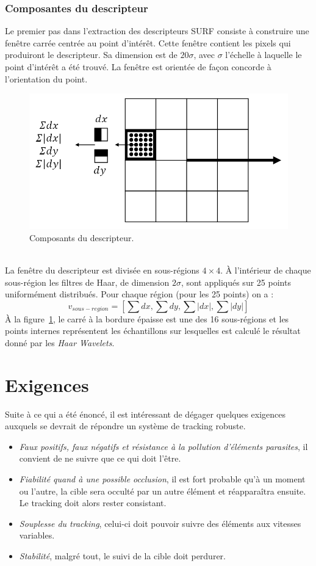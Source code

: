 \documentclass[a4paper,12pt]{report}
\begin{document}
\subsubsection{Composantes du descripteur}
Le premier pas dans l'extraction des descripteurs SURF consiste à construire une fenêtre carrée centrée au point d'intérêt. Cette fenêtre contient les pixels qui produiront le descripteur. Sa dimension est de $20\sigma$, avec $\sigma$ l'échelle à laquelle le point d'intérêt a été trouvé. La fenêtre est orientée de façon concorde à l'orientation du point.
\begin{figure}[ht]
\centering
\includegraphics[scale=0.3]{figure8.png}
\caption{Composants du descripteur.}
\label{fig8}
\end{figure}
\\La fenêtre du descripteur est divisée en sous-régions  $4\times4$. \`A l'intérieur de chaque sous-région les filtres de Haar, de dimension $2\sigma$, sont appliqués sur 25 points uniformément distribués. Pour chaque région (pour les 25 points) on a : 
$$v_{sous-region}= \left[ \sum dx,\sum dy,\sum |dx|,\sum |dy|\right]$$
\`A la figure~\ref{fig8}, le carré à la bordure épaisse est une des 16 sous-régions et les points internes représentent les échantillons sur lesquelles est calculé le résultat donné par les \textit{Haar Wavelets}.

\section{Exigences}
Suite à ce qui a été énoncé, il est intéressant de dégager quelques exigences auxquels se devrait de répondre un système de tracking robuste. 
\begin{itemize}
\item \textit{Faux positifs, faux négatifs et résistance à la pollution d'éléments parasites}, il convient de ne suivre que ce qui doit l'être.
\item \textit{Fiabilité quand à une possible occlusion}, il est fort probable qu'à un moment ou l'autre, la cible sera occulté par un autre élément et réapparaîtra ensuite. Le tracking doit alors rester consistant.
\item \textit{Souplesse du tracking}, celui-ci doit pouvoir suivre des éléments aux vitesses variables.
\item \textit{Stabilité}, malgré tout, le suivi de la cible doit perdurer.
\end{itemize}
\end{document}
